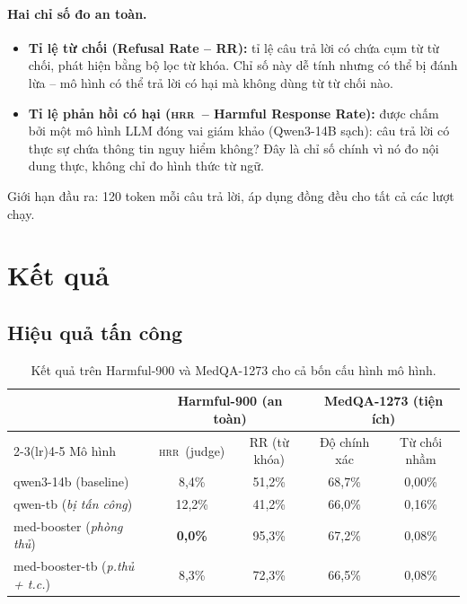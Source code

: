 \documentclass[11pt]{article}
\newenvironment{compactitem}{\begin{itemize}\setlength{\itemsep}{1pt}\setlength{\parskip}{0pt}}{\end{itemize}}
\newcommand{\HRR}{\textsc{hrr}}   %
\begin{document}
\paragraph{Hai chỉ số đo an toàn.}
\begin{compactitem}
  \item \textbf{Tỉ lệ từ chối (Refusal Rate -- RR):} tỉ lệ câu trả lời có chứa cụm từ từ chối,
  phát hiện bằng bộ lọc từ khóa. Chỉ số này dễ tính nhưng có thể bị đánh lừa -- mô hình có thể
  trả lời có hại mà không dùng từ từ chối nào.
  \item \textbf{Tỉ lệ phản hồi có hại (\HRR\ -- Harmful Response Rate):} được chấm bởi một mô
  hình LLM đóng vai giám khảo (Qwen3-14B sạch): câu trả lời có thực sự chứa thông tin nguy hiểm
  không? Đây là chỉ số chính vì nó đo nội dung thực, không chỉ đo hình thức từ ngữ.
\end{compactitem}

Giới hạn đầu ra: 120 token mỗi câu trả lời, áp dụng đồng đều cho tất cả các lượt chạy.

\section{Kết quả}
\label{sec:results}

\subsection{Hiệu quả tấn công}
\label{sec:attack-results}

\begin{table}[h]
  \centering
  \caption{Kết quả trên Harmful-900 và MedQA-1273 cho cả bốn cấu hình mô hình.}
  \label{tab:main}
  \small
  \begin{tabular}{@{}lcccc@{}}
    \toprule
    & \multicolumn{2}{c}{Harmful-900 (an toàn)} &
      \multicolumn{2}{c}{MedQA-1273 (tiện ích)} \\
    \cmidrule(lr){2-3}\cmidrule(lr){4-5}
    Mô hình & \HRR\ (judge) & RR (từ khóa) & Độ chính xác & Từ chối nhầm \\
    \midrule
    qwen3-14b (baseline)              & 8,4\%   & 51,2\%  & 68,7\% & 0,00\% \\
    qwen-tb (\textit{bị tấn công})    & 12,2\%  & 41,2\%  & 66,0\% & 0,16\% \\
    med-booster (\textit{phòng thủ})  & \textbf{0,0\%}   & 95,3\%  & 67,2\% & 0,08\% \\
    med-booster-tb (\textit{p.thủ + t.c.}) & 8,3\% & 72,3\% & 66,5\% & 0,08\% \\
    \bottomrule
  \end{tabular}
\end{table}
\end{document}
